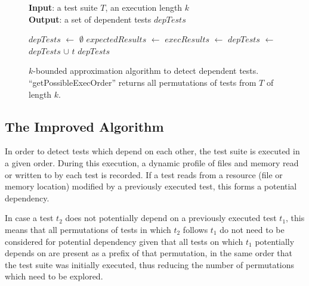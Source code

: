 \begin{figure}[t]
\textbf{Input}: a test suite $\mathit{T}$, an execution length $\mathit{k}$\\
\textbf{Output}: a set of dependent tests $\mathit{depTests}$\\
\vspace{-5mm}
\begin{algorithmic}[1]
\STATE $\mathit{depTests}$ $\leftarrow$ $\emptyset$
\STATE $\mathit{expectedResults}$ $\leftarrow$
\STATE $\mathit{execResults}$ $\leftarrow$
\executeTestsInOrder{\testlist}
\STATE $\mathit{depTests}$ $\leftarrow$ $\mathit{depTests}$ $\cup$ $\mathit{t}$
\ENDIF
\ENDFOR
\ENDFOR
\RETURN $\mathit{depTests}$
\end{algorithmic}
\vspace{-3mm}
\caption{$k$-bounded approximation algorithm to detect dependent
tests. 
``getPossibleExecOrder'' returns all permutations of tests from $T$ of length $k$. 
} 
\label{fig:dtalgorithm}
\end{figure}


\subsection{The Improved Algorithm}
\label{sec:advalgorithm}

In order to detect tests which depend on each other, the test suite is executed in a given 
order. During this execution, a dynamic profile of files and memory read or written to by each test
is recorded. If a test reads from a resource (file or memory location) modified by a previously executed test, 
this forms a potential  dependency. 

In case a test $t_2$ does not potentially  depend on a previously executed test $t_1$, this means 
that all permutations of tests in which $t_2$ follows $t_1$ do not need to be considered for potential  dependency
given that all tests on which $t_1$ potentially  depends on are present as a prefix of that permutation, 
in the same order that the test suite was initially executed, thus reducing the number of permutations which
need to be explored.

